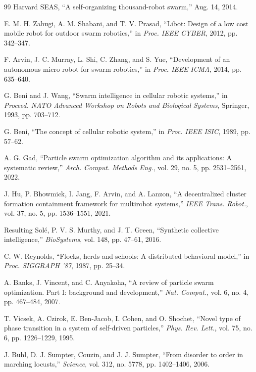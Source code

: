 \documentclass[letterpaper, 10pt, conference]{IEEEtran}
\begin{document}
\begin{thebibliography}{99}
Harvard SEAS, ``A self-organizing thousand-robot swarm,'' Aug. 14, 2014.

E. M. H. Zahugi, A. M. Shabani, and T. V. Prasad, ``Libot: Design of a low cost mobile robot for outdoor swarm robotics,'' in \emph{Proc. IEEE CYBER}, 2012, pp. 342--347.

F. Arvin, J. C. Murray, L. Shi, C. Zhang, and S. Yue, ``Development of an autonomous micro robot for swarm robotics,'' in \emph{Proc. IEEE ICMA}, 2014, pp. 635--640.

G. Beni and J. Wang, ``Swarm intelligence in cellular robotic systems,'' in \emph{Proceed. NATO Advanced Workshop on Robots and Biological Systems}, Springer, 1993, pp. 703--712.

G. Beni, ``The concept of cellular robotic system,'' in \emph{Proc. IEEE ISIC}, 1989, pp. 57--62.

A. G. Gad, ``Particle swarm optimization algorithm and its applications: A systematic review,'' \emph{Arch. Comput. Methods Eng.}, vol. 29, no. 5, pp. 2531--2561, 2022.

J. Hu, P. Bhowmick, I. Jang, F. Arvin, and A. Lanzon, ``A decentralized cluster formation containment framework for multirobot systems,'' \emph{IEEE Trans. Robot.}, vol. 37, no. 5, pp. 1536--1551, 2021.

Resulting Solé, P. V. S. Murthy, and J. T. Green, ``Synthetic collective intelligence,'' \emph{BioSystems}, vol. 148, pp. 47--61, 2016.

C. W. Reynolds, ``Flocks, herds and schools: A distributed behavioral model,'' in \emph{Proc. SIGGRAPH '87}, 1987, pp. 25--34.

A. Banks, J. Vincent, and C. Anyakoha, ``A review of particle swarm optimization. Part I: background and development,'' \emph{Nat. Comput.}, vol. 6, no. 4, pp. 467--484, 2007.

T. Vicsek, A. Czirok, E. Ben-Jacob, I. Cohen, and O. Shochet, ``Novel type of phase transition in a system of self-driven particles,'' \emph{Phys. Rev. Lett.}, vol. 75, no. 6, pp. 1226--1229, 1995.

J. Buhl, D. J. Sumpter, Couzin, and J. J. Sumpter, ``From disorder to order in marching locusts,'' \emph{Science}, vol. 312, no. 5778, pp. 1402--1406, 2006.


\end{thebibliography}
\end{document}
